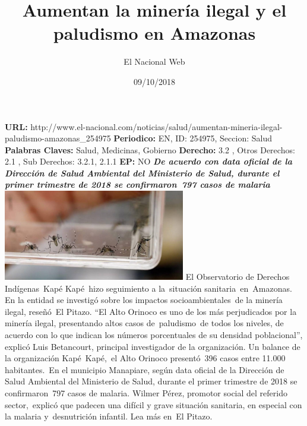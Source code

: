 \documentclass{article}%
\title{\textbf{Aumentan la minería ilegal y el paludismo en Amazonas}}%
\author{El Nacional Web}%
\date{09/10/2018}%
\begin{document}
%
\normalsize%
\maketitle%
\textbf{URL: }%
http://www.el{-}nacional.com/noticias/salud/aumentan{-}mineria{-}ilegal{-}paludismo{-}amazonas\_254975\newline%
%
\textbf{Periodico: }%
EN, %
ID: %
254975, %
Seccion: %
Salud\newline%
%
\textbf{Palabras Claves: }%
Salud, Medicinas, Gobierno\newline%
%
\textbf{Derecho: }%
3.2%
, Otros Derechos: %
2.1%
, Sub Derechos: %
3.2.1, 2.1.1%
\newline%
%
\textbf{EP: }%
NO\newline%
\newline%
%
\textbf{\textit{De acuerdo con data oficial de la Dirección de Salud Ambiental del Ministerio de Salud, durante el primer trimestre de 2018 se confirmaron~797 casos de malaria}}%
\newline%
\newline%
%
\includegraphics[width=300px]{101.jpg}%
\newline%
%
El Observatorio de Derechos Indígenas~Kapé Kapé~hizo seguimiento a la~situación sanitaria~en~Amazonas. En la entidad se investigó sobre los impactos socioambientales~de la minería ilegal, reseñó~El Pitazo.%
\newline%
%
“El Alto Orinoco es uno de los más perjudicados por la minería ilegal, presentando altos casos de~paludismo~de todos los niveles, de acuerdo con lo que indican los números porcentuales de su densidad poblacional”, explicó Luis Betancourt, principal investigador de la organización.%
\newline%
%
Un balance de la organización Kapé~Kapé,~el Alto Orinoco presentó~396 casos entre 11.000 habitantes.~En el municipio Manapiare, según data oficial de la Dirección de Salud Ambiental del Ministerio de Salud, durante el primer trimestre de 2018 se confirmaron~797 casos de malaria.%
\newline%
%
Wilmer Pérez, promotor social del referido sector,~explicó que padecen una difícil y grave situación sanitaria, en especial con la malaria y~desnutrición infantil.%
\newline%
%
Lea más en~El Pitazo.%
\newline%
%
\end{document}
